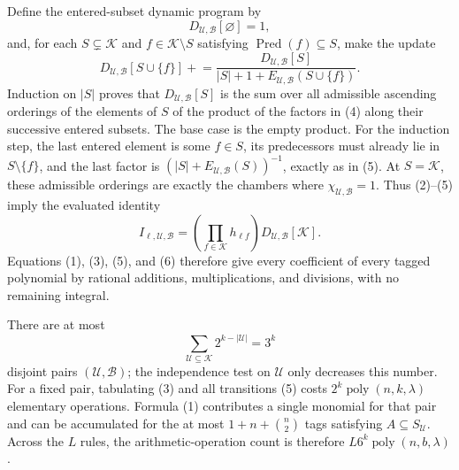 Define the entered-subset dynamic program by
\[
 D_{\mathcal U,\mathcal B}[\varnothing]=1,
\]
and, for each \(S\subsetneq\mathcal K\) and \(f\in\mathcal K\setminus S\) satisfying \(\operatorname{Pred}(f)\subseteq S\), make the update
\[
 D_{\mathcal U,\mathcal B}[S\cup\{f\}]
 \mathrel{+}=
 \frac{D_{\mathcal U,\mathcal B}[S]}
 {|S|+1+E_{\mathcal U,\mathcal B}(S\cup\{f\})}.                              \tag{5}
\]
Induction on \(|S|\) proves that \(D_{\mathcal U,\mathcal B}[S]\) is the sum over all admissible ascending orderings of the elements of \(S\) of the product of the factors in (4) along their successive entered subsets.  The base case is the empty product.  For the induction step, the last entered element is some \(f\in S\), its predecessors must already lie in \(S\setminus\{f\}\), and the last factor is \((|S|+E_{\mathcal U,\mathcal B}(S))^{-1}\), exactly as in (5).  At \(S=\mathcal K\), these admissible orderings are exactly the chambers where \(\chi_{\mathcal U,\mathcal B}=1\).  Thus (2)--(5) imply the evaluated identity
\[
 I_{\ell,\mathcal U,\mathcal B}
 =\left(\prod_{f\in\mathcal K}h_{\ell f}\right)
 D_{\mathcal U,\mathcal B}[\mathcal K].                                      \tag{6}
\]
Equations (1), (3), (5), and (6) therefore give every coefficient of every tagged polynomial by rational additions, multiplications, and divisions, with no remaining integral.

There are at most
\[
 \sum_{\mathcal U\subseteq\mathcal K}2^{k-|\mathcal U|}=3^k
\]
disjoint pairs \((\mathcal U,\mathcal B)\); the independence test on \(\mathcal U\) only decreases this number.  For a fixed pair, tabulating (3) and all transitions (5) costs \(2^k\operatorname{poly}(n,k,\lambda)\) elementary operations.  Formula (1) contributes a single monomial for that pair and can be accumulated for the at most \(1+n+\binom n2\) tags satisfying \(A\subseteq S_{\mathcal U}\).  Across the \(L\) rules, the arithmetic-operation count is therefore \(L6^k\operatorname{poly}(n,b,\lambda)\).

